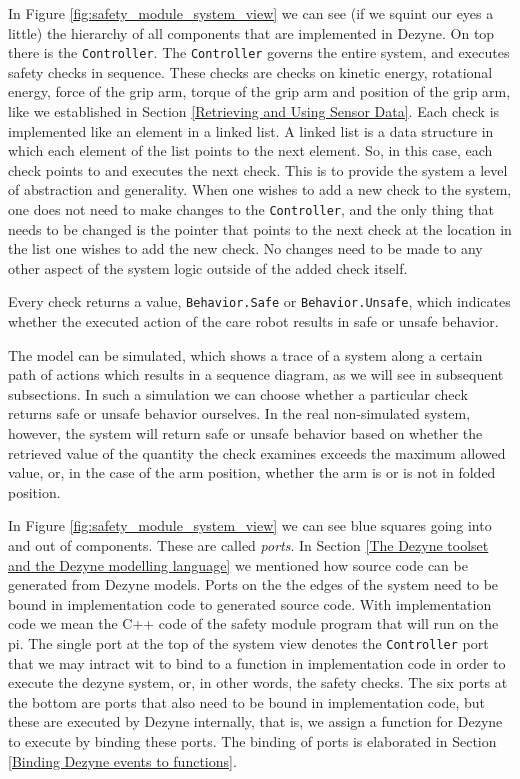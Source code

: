 \documentclass[12pt]{scrreprt}
\begin{document}
In Figure \ref{fig:safety_module_system_view} we can see (if we squint our eyes a little) the hierarchy of all components that are implemented in Dezyne. On top there is the \texttt{Controller}. The \texttt{Controller} governs the entire system, and executes safety checks in sequence. These checks are checks on kinetic energy, rotational energy, force of the grip arm, torque of the grip arm and position of the grip arm, like we established in Section \ref{Retrieving and Using Sensor Data}. Each check is implemented like an element in a linked list. A linked list is a data structure in which each element of the list points to the next element. So, in this case, each check points to and executes the next check. This is to provide the system a level of abstraction and generality. When one wishes to add a new check to the system, one does not need to make changes to the \texttt{Controller}, and the only thing that needs to be changed is the pointer that points to the next check at the location in the list one wishes to add the new check. No changes need to be made to any other aspect of the system logic outside of the added check itself.
\par
Every check returns a value, \texttt{Behavior.Safe} or \texttt{Behavior.Unsafe}, which indicates whether the executed action of the care robot results in safe or unsafe behavior. 
\par
The model can be simulated, which shows a trace of a system along a certain path of actions which results in a sequence diagram, as we will see in subsequent subsections. In such a simulation we can choose whether a particular check returns safe or unsafe behavior ourselves. In the real non-simulated system, however, the system will return safe or unsafe behavior based on whether the retrieved value of the quantity the check examines exceeds the maximum allowed value, or, in the case of the arm position, whether the arm is or is not in folded position. 
\par
In Figure \ref{fig:safety_module_system_view} we can see blue squares going into and out of components. These are called \textit{ports}. In Section \ref{The Dezyne toolset and the Dezyne modelling language} we mentioned how source code can be generated from Dezyne models. Ports on the the edges of the system need to be bound in implementation code to generated source code. With implementation code we mean the C++ code of the safety module program that will run on the \gls{pi}. The single port at the top of the system view denotes the \texttt{Controller} port that we may intract wit to bind to a function in implementation code in order to execute the dezyne system, or, in other words, the safety checks. The six ports at the bottom are ports that also need to be bound in implementation code, but these are executed by Dezyne internally, that is, we assign a function for Dezyne to execute by binding these ports. The binding of ports is elaborated in Section \ref{Binding Dezyne events to functions}.
\end{document}

